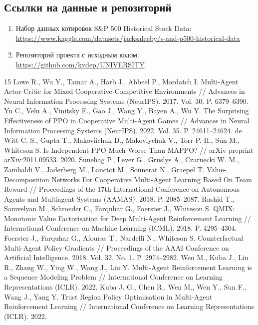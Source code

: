 \documentclass[11pt,a4paper]{article}
\begin{document}
\subsection{Ссылки на данные и репозиторий}

\begin{enumerate}[leftmargin=*]
\item Набор данных котировок S\&P 500 Historical Stock Data:\\
\url{https://www.kaggle.com/datasets/jacksaleeby/s-and-p500-historical-data}
\item Репозиторий проекта с исходным кодом:\\
\url{https://github.com/kvdep/UNIVERSITY}
\end{enumerate}

\begin{thebibliography}{15}
 Lowe R., Wu Y., Tamar A., Harb J., Abbeel P., Mordatch I. Multi-Agent Actor-Critic for Mixed Cooperative-Competitive Environments // Advances in Neural Information Processing Systems (NeurIPS). 2017. Vol. 30. P. 6379--6390.
 Yu C., Velu A., Vinitsky E., Gao J., Wang Y., Bayen A., Wu Y. The Surprising Effectiveness of PPO in Cooperative Multi-Agent Games // Advances in Neural Information Processing Systems (NeurIPS). 2022. Vol. 35. P. 24611--24624.
 de Witt C. S., Gupta T., Makoviichuk D., Makoviychuk V., Torr P. H., Sun M., Whiteson S. Is Independent PPO Much Worse Than MAPPO? // arXiv preprint arXiv:2011.09533. 2020.
 Sunehag P., Lever G., Gruslys A., Czarnecki W. M., Zambaldi V., Jaderberg M., Lanctot M., Sonnerat N., Graepel T. Value-Decomposition Networks For Cooperative Multi-Agent Learning Based On Team Reward // Proceedings of the 17th International Conference on Autonomous Agents and Multiagent Systems (AAMAS). 2018. P. 2085--2087.
 Rashid T., Samvelyan M., Schroeder C., Farquhar G., Foerster J., Whiteson S. QMIX: Monotonic Value Factorisation for Deep Multi-Agent Reinforcement Learning // International Conference on Machine Learning (ICML). 2018. P. 4295--4304.
 Foerster J., Farquhar G., Afouras T., Nardelli N., Whiteson S. Counterfactual Multi-Agent Policy Gradients // Proceedings of the AAAI Conference on Artificial Intelligence. 2018. Vol. 32. No. 1. P. 2974--2982.
 Wen M., Kuba J., Lin R., Zhang W., Ying W., Wang J., Liu Y. Multi-Agent Reinforcement Learning is a Sequence Modeling Problem // International Conference on Learning Representations (ICLR). 2022.
 Kuba J. G., Chen R., Wen M., Wen Y., Sun F., Wang J., Yang Y. Trust Region Policy Optimisation in Multi-Agent Reinforcement Learning // International Conference on Learning Representations (ICLR). 2022.

\end{thebibliography}
\end{document}
